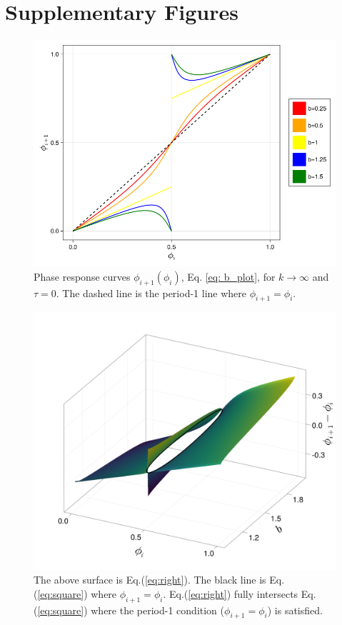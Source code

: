 \section{Supplementary Figures}
\begin{figure}[H]
    \begin{center}
    \includegraphics[width=.7\textwidth]{figures/b_plot.png}
    \end{center}
\caption{Phase response curves $\phi_{i+1}(\phi_i)$, Eq. \ref{eq: b_plot}, for $k\rightarrow \infty$ and $\tau = 0$. The dashed line is the period-1 line where $\phi_{i+1}=\phi_i$.}
\label{b_plot}
\end{figure}

\begin{figure}[H]
    \begin{center}
    \includegraphics[width=.7\textwidth]{figures/eqs17_fig.png}
    \end{center}
\caption{The above surface is Eq.(\ref{eq:right}). The black line is Eq.(\ref{eq:square}) where $\phi_{i+1}=\phi_i$. Eq.(\ref{eq:right}) fully intersects Eq.(\ref{eq:square}) where the period-1 condition ($\phi_{i+1}=\phi_i$) is satisfied.}
\label{instabbound}
\end{figure}

